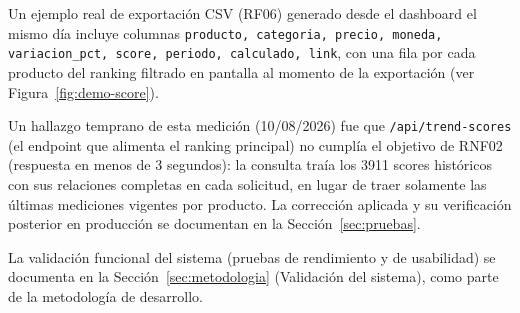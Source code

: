 Un ejemplo real de exportación CSV (RF06) generado desde el dashboard el mismo día incluye columnas \texttt{producto, categoria, precio, moneda, variacion\_pct, score, periodo, calculado, link}, con una fila por cada producto del ranking filtrado en pantalla al momento de la exportación (ver Figura~\ref{fig:demo-score}).

Un hallazgo temprano de esta medición (10/08/2026) fue que \texttt{/api/trend-scores} (el endpoint que alimenta el ranking principal) no cumplía el objetivo de RNF02 (respuesta en menos de 3 segundos): la consulta traía los 3911 scores históricos con sus relaciones completas en cada solicitud, en lugar de traer solamente las últimas mediciones vigentes por producto. La corrección aplicada y su verificación posterior en producción se documentan en la Sección~\ref{sec:pruebas}.

La validación funcional del sistema (pruebas de rendimiento y de usabilidad) se documenta en la Sección~\ref{sec:metodologia} (Validación del sistema), como parte de la metodología de desarrollo.
